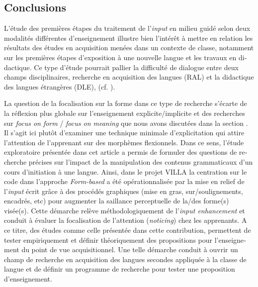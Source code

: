 \documentclass[output=paper]{langscibook}
\begin{document}
\begin{otherlanguage}{french}
\section{Conclusions}\label{sec:watorek:7}

L’étude des premières étapes du traitement de l’\textit{input} en milieu guidé selon deux modalités différentes d’enseignement illustre bien l’intérêt à mettre en relation les résultats des études en acquisition menées dans un contexte de classe, notamment sur les premières étapes d’exposition à une nouvelle langue et les travaux en didactique. Ce type d’étude pourrait pallier  la difficulté de dialogue entre deux champs disciplinaires, recherche en acquisition des langues (RAL) et la didactique des langues étrangères (DLE), (cf. \citealt{Véronique2005Interrelations,Véronique2019,Véronique2021}).

La question de la focalisation sur la forme dans ce type de recherche s’écarte de la réflexion plus globale sur l’enseignement explicite/implicite et des recherches sur \textit{focus on form} / \textit{focus on meaning} que nous avons discutées dans la section . Il s’agit ici plutôt d’examiner une technique minimale d’explicitation qui attire l’attention de l’apprenant sur des morphèmes flexionnels. Dans ce sens, l’étude exploratoire présentée dans cet article a permis de formuler des questions de recherche précises sur l’impact de la manipulation des contenus grammaticaux d’un cours d’initiation à une langue. Ainsi, dans le projet VILLA la centration sur le code dans l’approche \textit{Form-based} a été opérationnalisée par la mise en relief de l’\textit{input} écrit grâce à des procédés graphiques (mise en gras, sur/soulignements, encadrés, etc) pour augmenter la saillance perceptuelle de la/des forme(s) visée(s). Cette démarche relève méthodologiquement de l’\textit{input enhancement} et conduit à évaluer la focalisation de l’attention (\textit{noticing}) chez les apprenants. A ce titre, des études comme celle présentée dans cette contribution, permettent de tester empiriquement et définir théoriquement des propositions pour l’enseignement du point de vue acquisitionnel. Une telle démarche conduit à ouvrir un champ de recherche en acquisition des langues secondes appliquée à la classe de langue et de définir un programme de recherche pour tester une proposition d’enseignement.



\sloppy\printbibliography[heading=subbibliography,notkeyword=this]


\end{otherlanguage}
\end{document}
